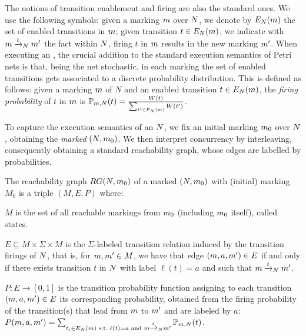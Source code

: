 The notions of transition enablement and firing are also the standard ones. We use the following symbols: given a marking $m$ over \uswn $N$, we denote by $E_{N}(m)$ the set of enabled transitions in $m$; given transition $t \in E_{N}(m)$, we indicate with $m\xrightarrow{t}_{N}m'$ the fact within $N$, firing $t$ in $m$ results in the new marking $m'$. When executing an \uswn, the crucial addition to the standard execution semantics of Petri nets is that, being the net stochastic, in each marking the set of enabled transitions gets associated to a discrete probability distribution. This is defined as follows: given a marking $m$ of $N$ and an enabled transition $t \in E_{N}(m)$, the \emph{firing probability} of $t$ in $m$ is $\mathbb{P}_{m,N}(t) = \frac{W(t)}{\sum_{t'\in E_{N}(m)}W(t')}$.

To capture the execution semantics of an \uswn $N$, we fix an initial marking $m_0$ over $N$, obtaining the \emph{marked} \uswn $(N,m_0)$. We then interpret concurrency by interleaving, consequently obtaining a standard reachability graph, whose edges are labelled by probabilities.


\begin{definition}
The reachability graph $RG(N,m_0)$ of a marked \uswn $(N,m_0)$ with (initial) marking $M_0$ is a triple $(M,E,P)$ where:
\begin{compactitem}[$\bullet$]
\item $M$ is the set of all reachable markings from $m_0$ (including $m_0$ itself), called states.
\item $E \subseteq M \times \Sigma \times M$ is the $\Sigma$-labeled transition relation induced by the transition firings of $N$, that is, for $m,m' \in M$, we have that edge $(m,a,m') \in E$ if and only if there exists transition $t$ in $N$ with label $\ell(t) = a$ and such that $m\xrightarrow{t}_{N}m'$.
\item $P:E \rightarrow [0,1]$ is the transition probability function assigning to each transition $(m,a,m') \in E$ its corresponding probability, obtained from the firing probability of the \uswn transition(s) that lead from $m$ to $m'$ and are labeled by $a$: $P(m,a,m') = \sum_{t_i \in E_{N}(m) \text{ s.t.~} \ell(t) = a \text{ and } m\xrightarrow{t}_{N}m'} \mathbb{P}_{m,N}(t)$.
\end{compactitem}
\end{definition}

